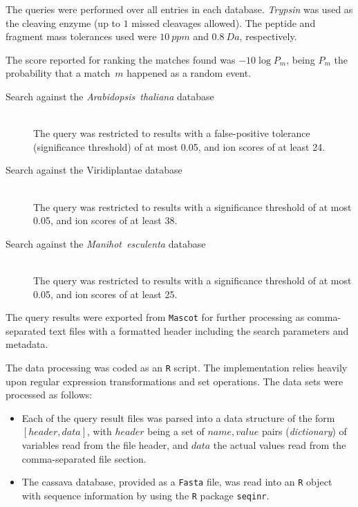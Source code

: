 \documentclass[oneside, a4paper, final]{memoir} %
\begin{document}
\begin{description}
		The queries were performed over all entries in each database. \emph{Trypsin} was used as the cleaving enzyme (up to $1$ missed cleavages allowed).
		The peptide and fragment mass tolerances used were $10\ ppm$ and $0.8\ Da$, respectively.

		The score reported for ranking the matches found was $-10\log{P_m}$, being $P_m$ the probability that a match~$m$ happened as a random event.

		\begin{description}
			\item[Search against the \emph{Arabidopsis~thaliana} database]\hfill\\
				The query was restricted to results with a false-positive tolerance (signif{}icance threshold) of at most 0.05, and ion scores of at least 24.

			\item[Search against the Viridiplantae database]\hfill\\
				The query was restricted to results with a signif{}icance threshold of at most 0.05, and ion scores of at least 38.
			\item[Search against the \emph{Manihot~esculenta} database]\hfill\\
				The query was restricted to results with a signif{}icance threshold of at most 0.05, and ion scores of at least 25.
		\end{description}

		The query results were exported from \texttt{Mascot} for further processing as comma-separated text f{}iles with a formatted header including the search parameters and metadata.

		The data processing was coded as an \texttt{R} script. The implementation relies heavily upon regular expression transformations and set operations.
		The data sets were processed as follows:

		\begin{itemize}
			\item Each of the query result f{}iles was parsed into a data structure of the form $[header, data]$, with $header$ being a set of $name, value$ pairs (\emph{dictionary})
			of variables read from the f{}ile header, and $data$ the actual values read from the comma-separated f{}ile section.

			\item The cassava database, provided as a \texttt{Fasta} f{}ile, was read into an \texttt{R} object with sequence information by using the \texttt{R} package \texttt{seqinr}.


\end{itemize}
\end{description}
\end{document}
